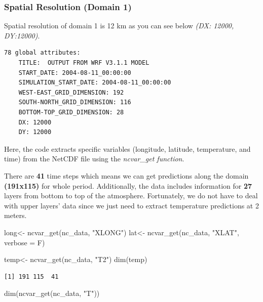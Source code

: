 \documentclass[
  letterpaper,
  DIV=11,
  numbers=noendperiod,
  abstract]{scrartcl}
\newenvironment{Shaded}{\begin{snugshade}}{\end{snugshade}}
\newcommand{\AttributeTok}[1]{\textcolor[rgb]{0.40,0.45,0.13}{#1}}
\newcommand{\FunctionTok}[1]{\textcolor[rgb]{0.28,0.35,0.67}{#1}}
\newcommand{\NormalTok}[1]{\textcolor[rgb]{0.00,0.23,0.31}{#1}}
\newcommand{\OtherTok}[1]{\textcolor[rgb]{0.00,0.23,0.31}{#1}}
\newcommand{\StringTok}[1]{\textcolor[rgb]{0.13,0.47,0.30}{#1}}
\begin{document}
\hypertarget{spatial-resolution-domain-1}{%
\subsubsection{Spatial Resolution (Domain
1)}\label{spatial-resolution-domain-1}}

Spatial resolution of domain 1 is 12 km as you can see below \emph{(DX:
12000, DY:12000)}.

\begin{verbatim}
78 global attributes:
    TITLE:  OUTPUT FROM WRF V3.1.1 MODEL
    START_DATE: 2004-08-11_00:00:00
    SIMULATION_START_DATE: 2004-08-11_00:00:00
    WEST-EAST_GRID_DIMENSION: 192
    SOUTH-NORTH_GRID_DIMENSION: 116
    BOTTOM-TOP_GRID_DIMENSION: 28
    DX: 12000
    DY: 12000
\end{verbatim}

Here, the code extracts specific variables (longitude, latitude,
temperature, and time) from the NetCDF file using the \emph{ncvar\_get
function}.

There are \textbf{41} time steps which means we can get predictions
along the domain \textbf{(191x115)} for whole period. Additionally, the
data includes information for \textbf{27} layers from bottom to top of
the atmosphere. Fortunately, we do not have to deal with upper layers'
data since we just need to extract temperature predictions at 2 meters.

\begin{Shaded}
\begin{Highlighting}[]
\NormalTok{long}\OtherTok{\textless{}{-}} \FunctionTok{ncvar\_get}\NormalTok{(nc\_data, }\StringTok{"XLONG"}\NormalTok{)}
\NormalTok{lat}\OtherTok{\textless{}{-}} \FunctionTok{ncvar\_get}\NormalTok{(nc\_data, }\StringTok{"XLAT"}\NormalTok{, }\AttributeTok{verbose =}\NormalTok{ F)}

\NormalTok{temp}\OtherTok{\textless{}{-}} \FunctionTok{ncvar\_get}\NormalTok{(nc\_data, }\StringTok{"T2"}\NormalTok{) }
\FunctionTok{dim}\NormalTok{(temp)}
\end{Highlighting}
\end{Shaded}

\begin{verbatim}
[1] 191 115  41
\end{verbatim}

\begin{Shaded}
\begin{Highlighting}[]
\FunctionTok{dim}\NormalTok{(}\FunctionTok{ncvar\_get}\NormalTok{(nc\_data, }\StringTok{"T"}\NormalTok{))}
\end{Highlighting}
\end{Shaded}
\end{document}
